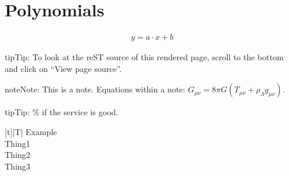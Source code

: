 \documentclass[letterpaper,10pt,english]{sphinxmanual}
\begin{document}
\sphinxstepscope


\section{Polynomials}
\label{\detokenize{math/polynomials:polynomials}}\label{\detokenize{math/polynomials::doc}}\begin{equation*}
\begin{split}y = a \cdot x + b\end{split}
\end{equation*}
\begin{sphinxadmonition}{tip}{Tip:}
\sphinxAtStartPar
To look at the reST source of this rendered page, scroll to the bottom
and click on “View page source”.
\end{sphinxadmonition}

\begin{sphinxadmonition}{note}{Note:}
\sphinxAtStartPar
This is a note.
Equations within a note:
\(G_{\mu\nu} = 8 \pi G (T_{\mu\nu}  + \rho_\Lambda g_{\mu\nu})\).
\end{sphinxadmonition}

\begin{sphinxadmonition}{tip}{Tip:}
\% if the service is good.


\begin{savenotes}\sphinxattablestart
\centering
\begin{tabulary}{\linewidth}[t]{|T|}
\hline
\sphinxstyletheadfamily 
\sphinxAtStartPar
Example
\\
\hline
\sphinxAtStartPar
Thing1
\\
\hline
\sphinxAtStartPar
Thing2
\\
\hline
\sphinxAtStartPar
Thing3
\\
\hline
\end{tabulary}
\par
\sphinxattableend\end{savenotes}
\end{sphinxadmonition}
\end{document}
